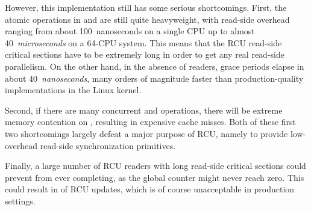 \QuickQuizEnd

However, this implementation still has some serious shortcomings.
First, the atomic operations in  and
 are still quite  heavyweight,
with read-side overhead ranging from about 100~nanoseconds on
a single  CPU up to almost 40~\emph{microseconds}
on a 64-CPU system.
This means that the RCU read-side critical sections
have to be extremely long in order to get any real
read-side parallelism.
On the other hand, in the absence of readers, grace periods elapse
in about 40~\emph{nanoseconds}, many orders of magnitude faster
than production-quality implementations in the Linux kernel.

\QuickQuizEnd

Second, if there are many concurrent 
and  operations, there will
be extreme memory contention on ,
resulting in expensive cache misses.
Both of these first two shortcomings largely defeat a major purpose of
RCU, namely to provide low-overhead read-side synchronization primitives.

Finally, a large number of RCU readers with long read-side
critical sections could prevent 
from ever completing, as the global counter might
never reach zero.
This could result in  of RCU updates, which
is of course unacceptable in production settings.

